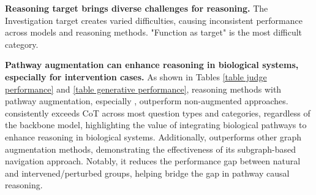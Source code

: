 \textbf{Reasoning target brings diverse challenges for reasoning.} The Investigation target creates varied difficulties, causing inconsistent performance across models and reasoning methods. "Function as target" is the most difficult category.


\textbf{Pathway augmentation can enhance reasoning in biological systems, especially for intervention cases.} As shown in Tables \ref{table judge performance} and \ref{table generative performance}, reasoning methods with pathway augmentation, especially \modelname, outperform non-augmented approaches. \modelname consistently exceeds CoT across most question types and categories, regardless of the backbone model, highlighting the value of integrating biological pathways to enhance reasoning in biological systems. Additionally, \modelname outperforms other graph augmentation methods, demonstrating the effectiveness of its subgraph-based navigation approach. Notably, it reduces the performance gap between natural and intervened/perturbed groups, helping bridge the gap in pathway causal reasoning.









